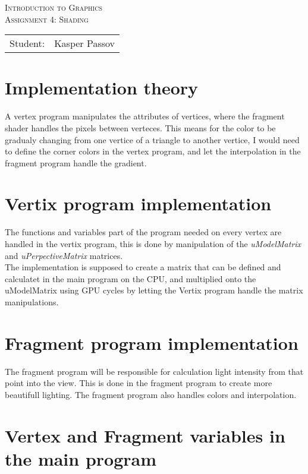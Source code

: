 \documentclass{article}
\begin{document}
\begin{titlepage}
\begin{center}
\textsc{Introduction to Graphics}\\[0.5cm]
\textsc{Assignment 4: Shading}\\[0.5cm]
\vspace{2 cm}
\begin{tabular}{ll}
Student: & Kasper Passov\\
\end{tabular}
\end{center}
\vspace{5 cm}
\newpage
\end{titlepage}

\section{Implementation theory}
A vertex program manipulates the attributes of vertices,
where the fragment shader handles the pixels between verteces.
This means for the color to be gradualy changing from one
vertice of a triangle to another vertice, I would need to
define the corner colors in the vertex program, and let 
the interpolation in the fragment program handle the
gradient.

\section{Vertix program implementation}
The functions and variables part of the program needed on
every vertex are handled in the vertix program, this is done
by manipulation of the \emph{uModelMatrix} and \emph{uPerpectiveMatrix}
matrices. \\
The implementation is supposed to create a matrix that can be
defined and calculatet in the main program on the CPU, 
and multiplied onto the uModelMatrix using GPU cycles by
letting the Vertix program handle the matrix manipulations.

\section{Fragment program implementation}
The fragment program will be responsible for calculation
light intensity from that point into the view. This is
done in the fragment program to create more beautifull
lighting. The fragment program also handles colors and
interpolation.

\section{Vertex and Fragment variables in the main program}
\end{document}
